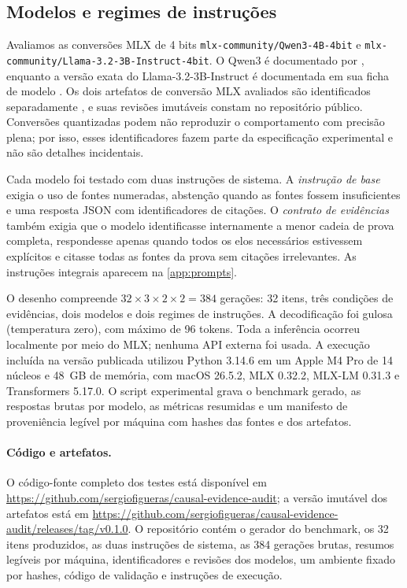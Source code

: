\documentclass[10pt,twocolumn]{article}
\begin{document}
\subsection{Modelos e regimes de instruções}

Avaliamos as conversões MLX de 4 bits \texttt{mlx-community/Qwen3-4B-4bit} e \texttt{mlx-community/Llama-3.2-3B-Instruct-4bit}. O Qwen3 é documentado por \citet{yang2025qwen3}, enquanto a versão exata do Llama-3.2-3B-Instruct é documentada em sua ficha de modelo \citep{meta2024llama32}. Os dois artefatos de conversão MLX avaliados são identificados separadamente \citep{mlxcommunity2025qwen3,mlxcommunity2024llama32}, e suas revisões imutáveis constam no repositório público. Conversões quantizadas podem não reproduzir o comportamento com precisão plena; por isso, esses identificadores fazem parte da especificação experimental e não são detalhes incidentais.

Cada modelo foi testado com duas instruções de sistema. A \emph{instrução de base} exigia o uso de fontes numeradas, abstenção quando as fontes fossem insuficientes e uma resposta JSON com identificadores de citações. O \emph{contrato de evidências} também exigia que o modelo identificasse internamente a menor cadeia de prova completa, respondesse apenas quando todos os elos necessários estivessem explícitos e citasse todas as fontes da prova sem citações irrelevantes. As instruções integrais aparecem na \cref{app:prompts}.

O desenho compreende $32\times 3\times 2\times 2=384$ gerações: 32 itens, três condições de evidências, dois modelos e dois regimes de instruções. A decodificação foi gulosa (temperatura zero), com máximo de 96 tokens. Toda a inferência ocorreu localmente por meio do MLX; nenhuma API externa foi usada. A execução incluída na versão publicada utilizou Python 3.14.6 em um Apple M4 Pro de 14 núcleos e 48~GB de memória, com macOS 26.5.2, MLX 0.32.2, MLX-LM 0.31.3 e Transformers 5.17.0. O script experimental grava o benchmark gerado, as respostas brutas por modelo, as métricas resumidas e um manifesto de proveniência legível por máquina com hashes das fontes e dos artefatos.

\paragraph{Código e artefatos.}
O código-fonte completo dos testes está disponível em \url{https://github.com/sergiofigueras/causal-evidence-audit}; a versão imutável dos artefatos está em \url{https://github.com/sergiofigueras/causal-evidence-audit/releases/tag/v0.1.0}. O repositório contém o gerador do benchmark, os 32 itens produzidos, as duas instruções de sistema, as 384 gerações brutas, resumos legíveis por máquina, identificadores e revisões dos modelos, um ambiente fixado por hashes, código de validação e instruções de execução.
\end{document}
